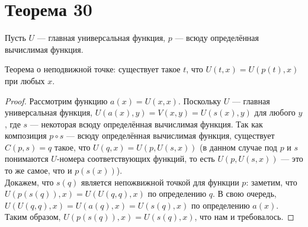 \documentclass[a4paper,12pt]{article}
\begin{document}
	\section {Теорема 30}
	{
	\noindent
	Пусть $U$ --- главная универсальная функция, $p$ --- всюду определённая вычислимая функция.
	}
	\begin{theorem}
	Теорема о неподвижной точке: существует такое $t$, что $U(t, x)=U(p(t), x)$ при любых $x$.
	\end{theorem}
	\begin{proof}
	Рассмотрим функцию $a(x) = U(x, x)$. Поскольку $U$ --- главная универсальная функция, $U(a(x), y)=V(x, y)=U(s(x), y)$ для любого $y$, где $s$ --- некоторая всюду определённая вычислимая функция.
    Так как композиция $p \circ s$ --- всюду определённая вычислимая функция, существует $C(p, s) = q$ такое, что $U(q, x)=U(p, U(s, x))$ (в данном случае под $p$ и $s$ понимаются $U$-номера соответствующих функций, то есть $U(p, U(s, x))$ --- это то же самое, что и $p(s(x))$).\\
    Докажем, что $s(q)$ является непожвижной точкой для функции $p$: заметим, что $U(p(s(q)), x)=U(U(q, q), x)$ по определению $q$. В свою очередь, $U(U(q, q), x)=U(a(q), x)=U(s(q), x)$ по определению $a(x)$. Таким образом, $U(p(s(q)), x)=U(s(q), x)$, что нам и требовалось.
	\end{proof}
	
	
\end{document}
